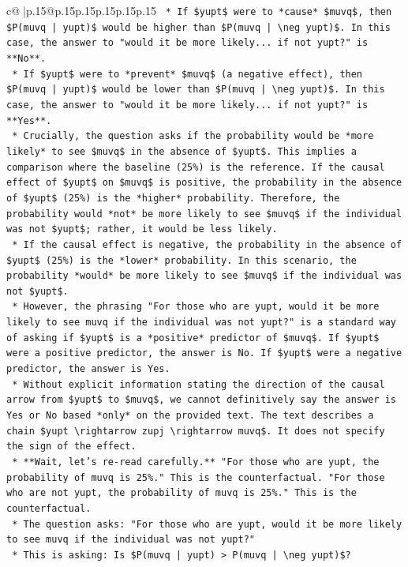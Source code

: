 \documentclass{article}
\begin{document}
{\begin{supertabular}{c@{$\;$}|p{.15\linewidth}@{}p{.15\linewidth}p{.15\linewidth}p{.15\linewidth}p{.15\linewidth}p{.15\linewidth}}
{{{\texttt{    *   If \$yupt\$ were to *cause* \$muvq\$, then \$P(muvq | yupt)\$ would be higher than \$P(muvq | \textbackslash{}neg yupt)\$. In this case, the answer to "would it be more likely... if not yupt?" is **No**.} \\
\texttt{    *   If \$yupt\$ were to *prevent* \$muvq\$ (a negative effect), then \$P(muvq | yupt)\$ would be lower than \$P(muvq | \textbackslash{}neg yupt)\$. In this case, the answer to "would it be more likely... if not yupt?" is **Yes**.} \\
\texttt{    *   Crucially, the question asks if the probability would be *more likely* to see \$muvq\$ in the absence of \$yupt\$. This implies a comparison where the baseline (25\%) is the reference. If the causal effect of \$yupt\$ on \$muvq\$ is positive, the probability in the absence of \$yupt\$ (25\%) is the *higher* probability. Therefore, the probability would *not* be more likely to see \$muvq\$ if the individual was not \$yupt\$; rather, it would be less likely.} \\
\texttt{    *   If the causal effect is negative, the probability in the absence of \$yupt\$ (25\%) is the *lower* probability. In this scenario, the probability *would* be more likely to see \$muvq\$ if the individual was not \$yupt\$.} \\
\texttt{    *   However, the phrasing "For those who are yupt, would it be more likely to see muvq if the individual was not yupt?" is a standard way of asking if \$yupt\$ is a *positive* predictor of \$muvq\$. If \$yupt\$ were a positive predictor, the answer is No. If \$yupt\$ were a negative predictor, the answer is Yes.} \\
\texttt{    *   Without explicit information stating the direction of the causal arrow from \$yupt\$ to \$muvq\$, we cannot definitively say the answer is Yes or No based *only* on the provided text. The text describes a chain \$yupt \textbackslash{}rightarrow zupj \textbackslash{}rightarrow muvq\$. It does not specify the sign of the effect.} \\
\texttt{    *   **Wait, let's re{-}read carefully.** "For those who are yupt, the probability of muvq is 25\%." This is the counterfactual. "For those who are not yupt, the probability of muvq is 25\%." This is the counterfactual.} \\
\texttt{    *   The question asks: "For those who are yupt, would it be more likely to see muvq if the individual was not yupt?"} \\
\texttt{    *   This is asking: Is \$P(muvq | yupt) > P(muvq | \textbackslash{}neg yupt)\$?} \\
}}}
\end{supertabular}}
\end{document}
